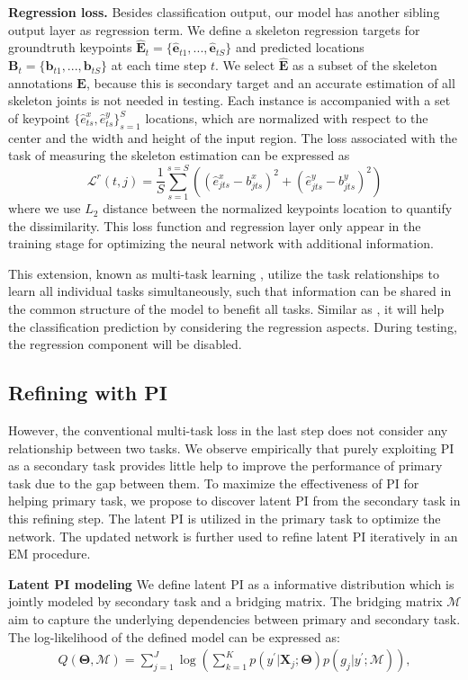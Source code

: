 \documentclass[10pt,twocolumn,letterpaper]{article}
\begin{document}
\noindent \textbf{Regression loss.} Besides classification output, our model has another sibling output layer as regression term. We define a skeleton regression targets for groundtruth keypoints $\hat{\bm{E}}_t=\{ \hat{\bm{e}}_{t1},...,\hat{\bm{e}}_{tS} \}$  and predicted locations $\bm{B}_t=\{\bm{b}_{t1},...,\bm{b}_{tS}\}$ at each time step $t$. We select $\hat{\bm{E}}$ as a subset of the skeleton annotations $\bm{E}$,  because this is secondary target and an accurate estimation of all skeleton joints is not needed in testing. Each instance is accompanied with a set of keypoint $\{\hat{e}^x_{ts}, \hat{e}^y_{ts}\}_{s=1}^S$ locations, which are normalized with respect to the center and the width and height of the input region. The loss associated with the task of measuring the skeleton estimation can be expressed as 
$$\mathcal{L}^{r}(t,j)=\frac{1}{S}\sum_{s=1}^{s=S}((\hat{e}^x_{jts}-b^x_{jts})^2+(\hat{e}^y_{jts}-b^y_{jts})^2)$$
where we use $L_2$ distance between the normalized keypoints location to quantify the dissimilarity. This loss function and regression layer only appear in the training stage for optimizing the neural network with additional information.

This extension, known as multi-task learning \cite{Mitchell_1997}, utilize the task relationships to learn all individual tasks simultaneously, such that information can be shared in the common structure of the model to benefit all tasks. Similar as \cite{girshick15fastrcnn}, it will help the classification prediction by considering the regression aspects. During testing, the regression component will be disabled. 
 
 
 
\subsection{Refining with PI}
\label{sec:refine}

However, the conventional multi-task loss in the last step does not consider any relationship between two tasks. We observe empirically that purely exploiting PI as a secondary task provides little help to improve the performance of primary task due to the gap between them. To maximize the effectiveness of PI for helping primary task, we propose to discover latent PI from the secondary task in this refining step. The latent PI is utilized in the primary task to optimize the network. The updated network is further used to refine latent PI iteratively in an EM procedure. 

\noindent \textbf{Latent PI modeling}  We define latent PI as a informative distribution which is jointly modeled by secondary task and a bridging matrix. The bridging matrix $\bm{\mathcal{M}}$ aim to capture the underlying dependencies between primary and secondary task. The log-likelihood of the defined model can be expressed as:
\begin{align}
Q(\bm{\Theta},\bm{\mathcal{M}}) = \sum_{j=1}^{J}\log(\sum_{k=1}^{K}p(y^{\prime}|\bm{X}_j;\bm{\Theta})p(g_j|y^{\prime};\bm{\mathcal{M}})),
\end{align}
\end{document}
